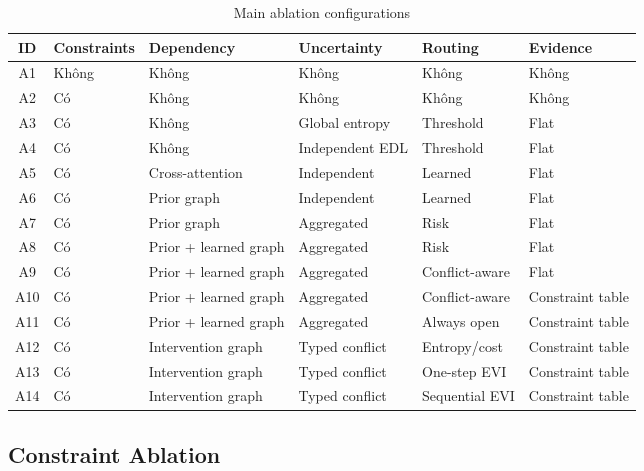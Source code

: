 \documentclass[11pt,a4paper]{article}
\begin{document}
\begin{table}[H]
\centering
\small
\caption{Main ablation configurations}
\begin{tabularx}{\linewidth}{cXXXXX}
\toprule
\textbf{ID}
& \textbf{Constraints}
& \textbf{Dependency}
& \textbf{Uncertainty}
& \textbf{Routing}
& \textbf{Evidence}\\
\midrule
A1 & Không & Không & Không & Không & Không\\
A2 & Có & Không & Không & Không & Không\\
A3 & Có & Không & Global entropy & Threshold & Flat\\
A4 & Có & Không & Independent EDL & Threshold & Flat\\
A5 & Có & Cross-attention & Independent & Learned & Flat\\
A6 & Có & Prior graph & Independent & Learned & Flat\\
A7 & Có & Prior graph & Aggregated & Risk & Flat\\
A8 & Có & Prior + learned graph & Aggregated & Risk & Flat\\
A9 & Có & Prior + learned graph & Aggregated & Conflict-aware & Flat\\
A10 & Có & Prior + learned graph & Aggregated & Conflict-aware & Constraint table\\
A11 & Có & Prior + learned graph & Aggregated & Always open & Constraint table\\
A12 & Có & Intervention graph & Typed conflict & Entropy/cost & Constraint table\\
A13 & Có & Intervention graph & Typed conflict & One-step EVI & Constraint table\\
A14 & Có & Intervention graph & Typed conflict & Sequential EVI & Constraint table\\
\bottomrule
\end{tabularx}
\end{table}

\subsection{Constraint Ablation}
\end{document}
